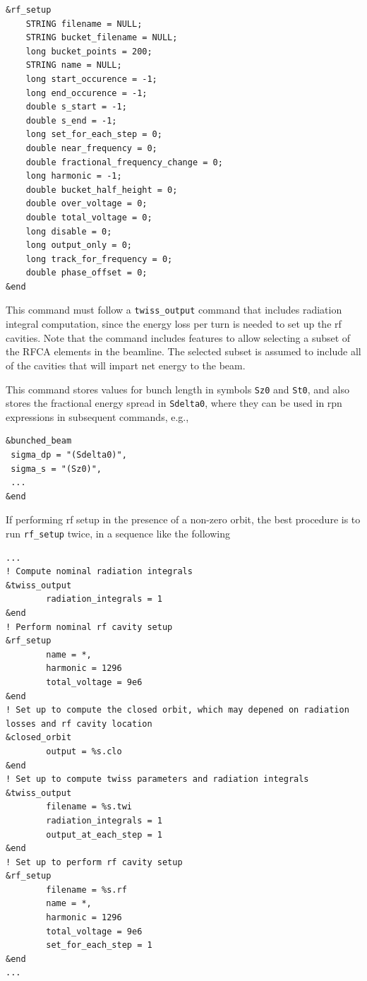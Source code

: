 \documentclass[11pt]{article}
\begin{document}
\begin{verbatim}
&rf_setup
    STRING filename = NULL;
    STRING bucket_filename = NULL;
    long bucket_points = 200;
    STRING name = NULL;
    long start_occurence = -1;
    long end_occurence = -1;
    double s_start = -1;
    double s_end = -1;
    long set_for_each_step = 0;
    double near_frequency = 0; 
    double fractional_frequency_change = 0;
    long harmonic = -1;
    double bucket_half_height = 0;
    double over_voltage = 0;
    double total_voltage = 0;
    long disable = 0;
    long output_only = 0;
    long track_for_frequency = 0;
    double phase_offset = 0;
&end
\end{verbatim}

This command must follow a \verb|twiss_output| command that includes radiation integral computation, since the 
energy loss per turn is needed to set up the rf cavities.
Note that the command includes features to allow selecting a subset of the RFCA elements in the beamline.
The selected subset is assumed to include all of the cavities that will impart net energy to the beam.

This command stores values for bunch length in symbols \verb|Sz0| and \verb|St0|, and also stores the fractional
energy spread in \verb|Sdelta0|, where they can be used in rpn expressions in subsequent  commands, e.g.,
\begin{verbatim}
&bunched_beam
 sigma_dp = "(Sdelta0)",
 sigma_s = "(Sz0)",
 ...
&end
\end{verbatim}

If performing rf setup in the presence of a non-zero orbit, the best procedure is to run \verb|rf_setup| twice,
in a sequence like the following
\begin{verbatim}
...
! Compute nominal radiation integrals
&twiss_output
        radiation_integrals = 1
&end
! Perform nominal rf cavity setup
&rf_setup
        name = *,
        harmonic = 1296
        total_voltage = 9e6
&end
! Set up to compute the closed orbit, which may depened on radiation losses and rf cavity location
&closed_orbit
        output = %s.clo       
&end
! Set up to compute twiss parameters and radiation integrals
&twiss_output
        filename = %s.twi
        radiation_integrals = 1
        output_at_each_step = 1
&end
! Set up to perform rf cavity setup
&rf_setup
        filename = %s.rf
        name = *,
        harmonic = 1296
        total_voltage = 9e6
        set_for_each_step = 1
&end
...
\end{verbatim}
\end{document}
